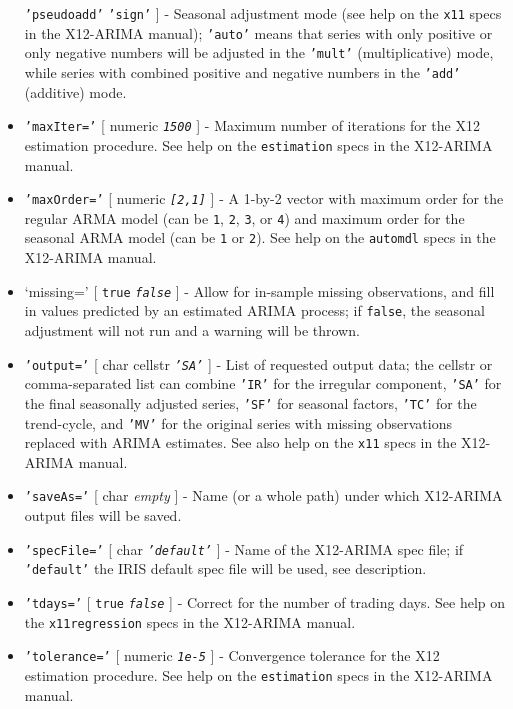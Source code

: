 \begin{itemize}
  \texttt{'pseudoadd'} \textbar{} \texttt{'sign'} {]} - Seasonal
  adjustment mode (see help on the \texttt{x11} specs in the X12-ARIMA
  manual); \texttt{'auto'} means that series with only positive or only
  negative numbers will be adjusted in the \texttt{'mult'}
  (multiplicative) mode, while series with combined positive and
  negative numbers in the \texttt{'add'} (additive) mode.
\item
  \texttt{'maxIter='} {[} numeric \textbar{} \emph{\texttt{1500}} {]} -
  Maximum number of iterations for the X12 estimation procedure. See
  help on the \texttt{estimation} specs in the X12-ARIMA manual.
\item
  \texttt{'maxOrder='} {[} numeric \textbar{} \emph{\texttt{{[}2,1{]}}}
  {]} - A 1-by-2 vector with maximum order for the regular ARMA model
  (can be \texttt{1}, \texttt{2}, \texttt{3}, or \texttt{4}) and maximum
  order for the seasonal ARMA model (can be \texttt{1} or \texttt{2}).
  See help on the \texttt{automdl} specs in the X12-ARIMA manual.
\item
  `missing=' {[} \texttt{true} \textbar{} \emph{\texttt{false}} {]} -
  Allow for in-sample missing observations, and fill in values predicted
  by an estimated ARIMA process; if \texttt{false}, the seasonal
  adjustment will not run and a warning will be thrown.
\item
  \texttt{'output='} {[} char \textbar{} cellstr \textbar{}
  \emph{\texttt{'SA'}} {]} - List of requested output data; the cellstr
  or comma-separated list can combine \texttt{'IR'} for the irregular
  component, \texttt{'SA'} for the final seasonally adjusted series,
  \texttt{'SF'} for seasonal factors, \texttt{'TC'} for the trend-cycle,
  and \texttt{'MV'} for the original series with missing observations
  replaced with ARIMA estimates. See also help on the \texttt{x11} specs
  in the X12-ARIMA manual.
\item
  \texttt{'saveAs='} {[} char \textbar{} \emph{empty} {]} - Name (or a
  whole path) under which X12-ARIMA output files will be saved.
\item
  \texttt{'specFile='} {[} char \textbar{} \emph{\texttt{'default'}} {]}
  - Name of the X12-ARIMA spec file; if \texttt{'default'} the IRIS
  default spec file will be used, see description.
\item
  \texttt{'tdays='} {[} \texttt{true} \textbar{} \emph{\texttt{false}}
  {]} - Correct for the number of trading days. See help on the
  \texttt{x11regression} specs in the X12-ARIMA manual.
\item
  \texttt{'tolerance='} {[} numeric \textbar{} \emph{\texttt{1e-5}} {]}
  - Convergence tolerance for the X12 estimation procedure. See help on
  the \texttt{estimation} specs in the X12-ARIMA manual.
\end{itemize}

